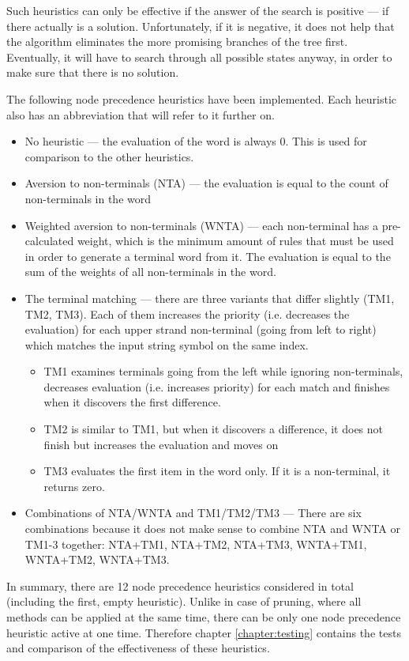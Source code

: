 \begin{enumerate}
Such heuristics can only be effective if the answer of the search is positive --- if there actually is a solution. Unfortunately, if it is negative, it does not help that the algorithm eliminates the more promising branches of the tree first. Eventually, it will have to search through all possible states anyway, in order to make sure that there is no solution.

The following node precedence heuristics have been implemented. Each heuristic also has an abbreviation that will refer to it further on.

\begin{itemize}
  \item{No heuristic --- the evaluation of the word is always 0. This is used for comparison to the other heuristics.}
  \item{Aversion to non-terminals (NTA) --- the evaluation is equal to the count of non-terminals in the word}
  \item{Weighted aversion to non-terminals (WNTA) --- each non-terminal has a pre-calculated weight, which is the minimum amount of rules that must be used in order to generate a terminal word from it. The evaluation is equal to the sum of the weights of all non-terminals in the word.}
  \item{The terminal matching --- there are three variants that differ slightly (TM1, TM2, TM3). Each of them increases the priority (i.e. decreases the evaluation) for each upper strand non-terminal (going from left to right) which matches the input string symbol on the same index.
  \begin{itemize}
    \item{TM1 examines terminals going from the left while ignoring non-terminals, decreases evaluation (i.e. increases priority) for each match and finishes when it discovers the first difference.}
    \item{TM2 is similar to TM1, but when it discovers a difference, it does not finish but increases the evaluation and moves on}
    \item{TM3 evaluates the first item in the word only. If it is a non-terminal, it returns zero.}
  \end{itemize}
  }
  \item{Combinations of NTA/WNTA and TM1/TM2/TM3 --- There are six combinations because it does not make sense to combine NTA and WNTA or TM1-3 together: NTA+TM1, NTA+TM2, NTA+TM3, WNTA+TM1, WNTA+TM2, WNTA+TM3.}
\end{itemize}

In summary, there are 12 node precedence heuristics considered in total (including the first, empty heuristic). Unlike in case of pruning, where all methods can be applied at the same time, there can be only one node precedence heuristic active at one time. Therefore chapter \ref{chapter:testing} contains the tests and comparison of the effectiveness of these heuristics.
\end{enumerate}

